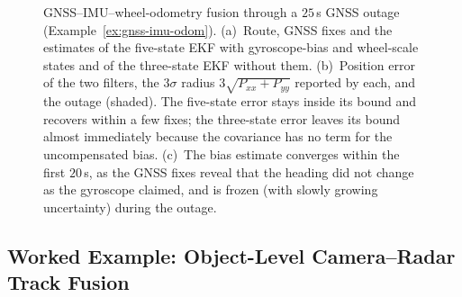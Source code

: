 \begin{figure}[!t]
{
}
\caption{GNSS--IMU--wheel-odometry fusion through a $25$\,s GNSS outage (Example~\ref{ex:gnss-imu-odom}). (a)~Route, GNSS fixes and the estimates of the five-state EKF with gyroscope-bias and wheel-scale states and of the three-state EKF without them. (b)~Position error of the two filters, the $3\sigma$ radius $3\sqrt{P_{xx}+P_{yy}}$ reported by each, and the outage (shaded). The five-state error stays inside its bound and recovers within a few fixes; the three-state error leaves its bound almost immediately because the covariance has no term for the uncompensated bias. (c)~The bias estimate converges within the first $20$\,s, as the GNSS fixes reveal that the heading did not change as the gyroscope claimed, and is frozen (with slowly growing uncertainty) during the outage.}
\label{fig:gnss-imu-odom}
\end{figure}

\subsection{Worked Example: Object-Level Camera--Radar Track Fusion}
\label{subsec:ex-camradar}

